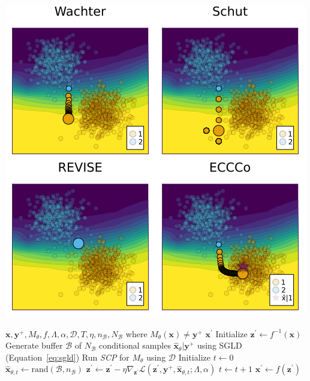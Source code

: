 \documentclass{article}
\begin{document}
\begin{minipage}[c]{0.40\textwidth}
  \centering
  \includegraphics[width=\textwidth]{../artifacts/results/images/poc.png}
   \label{fig:eccco}
\end{minipage}  
\hfill
\begin{minipage}[c]{0.50\textwidth}
\label{alg:eccco}
\begin{algorithmic}[1]
  \Require $\mathbf{x}, \mathbf{y}^+, M_{\theta}, f, \Lambda, \alpha, \mathcal{D}, T, \eta, n_{\mathcal{B}}, N_{\mathcal{B}}$ \linebreak where $M_{\theta}(\mathbf{x})\neq\mathbf{y}^+$
  \Ensure $\mathbf{x}^\prime$
  \State Initialize $\mathbf{z}^\prime \gets f^{-1}(\mathbf{x})$
  \State Generate buffer $\mathcal{B}$ of $N_{\mathcal{B}}$ conditional samples $\hat{\mathbf{x}}_{\theta}|\mathbf{y}^+$ using SGLD (Equation~\ref{eq:sgld})
  \State Run \textit{SCP} for $M_{\theta}$ using $\mathcal{D}$
  \State Initialize $t \gets 0$
  \State $\hat{\mathbf{x}}_{\theta, t} \gets \text{rand}(\mathcal{B},n_{\mathcal{B}})$
  \State $\mathbf{z}^\prime \gets \mathbf{z}^\prime - \eta \nabla_{\mathbf{z}^\prime} \mathcal{L}(\mathbf{z}^\prime,\mathbf{y}^+,\hat{\mathbf{x}}_{\theta, t}; \Lambda, \alpha)$
  \State $t \gets t+1$
  \EndWhile
  \State $\mathbf{x}^\prime \gets f(\mathbf{z}^\prime)$
\end{algorithmic}
\end{minipage}
\end{document}

